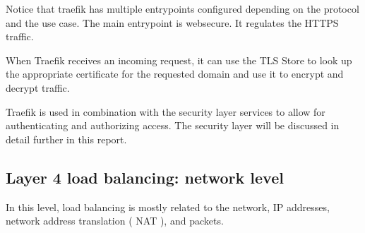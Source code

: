 Notice that traefik has multiple entrypoints configured depending on the protocol and the use case. The main entrypoint is websecure. It regulates the HTTPS traffic.  

When Traefik receives an incoming request, it can use the TLS Store to look up the appropriate certificate for the requested domain and use it to encrypt and decrypt traffic. 

Traefik is used in combination with the security layer services to allow for authenticating and authorizing access. The security layer will be discussed in detail further in this report. 

\subsection{Layer 4 load balancing: network level }

In this level, load balancing is mostly related to the network, IP addresses, network address translation ( NAT ), and packets. 

